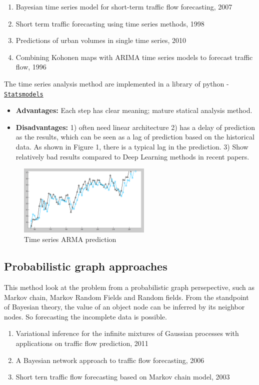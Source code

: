 \documentclass[11pt]{article}
\begin{document}
\begin{enumerate}
	\item Bayesian time series model for short-term traffic flow forecasting, 2007
	\item Short term traffic forecasting using time series methods, 1998
	\item Predictions of urban volumes in single time series, 2010
	\item Combining Kohonen maps with ARIMA time series models to forecast traffic flow, 1996 
\end{enumerate}

The time series analysis method are implemented in a library of python - 
\href{http://www.statsmodels.org/stable/index.html}{\tt{Statsmodels}}

\begin{itemize}
	\item \textbf{Advantages:} Each step has clear meaning; mature statical analysis method.
	
	\item \textbf{Disadvantages:} 1) often need linear architecture 2) has a delay of prediction as the results, which can be seen as a lag of prediction based on the historical data. As shown in Figure 1, there is a typical lag in the prediction. 3) Show relatively bad results compared to Deep Learning methods in recent papers.
\end{itemize}
\begin{figure}[ht]
	\centering
	\includegraphics[width=2.5in]{pic1.png}
	\caption{Time series ARMA prediction}
\end{figure}
\subsection{Probabilistic graph approaches}
This method look at the problem from a probabilistic graph persepective, such as Markov chain, Markov Random Fields and Random fields.  From the  standpoint  of  Bayesian  theory,  the  value  of  an  object node can be inferred by its neighbor nodes. So forecasting the incomplete data is possible.
\begin{enumerate}
	\item Variational inference for the infinite mixtures of Gaussian processes with applications on traffic flow prediction, 2011
	\item A Bayesian network approach to traffic flow forecasting, 2006
	\item Short tern traffic flow forecasting based on Markov chain model, 2003
\end{enumerate}
\end{document}
